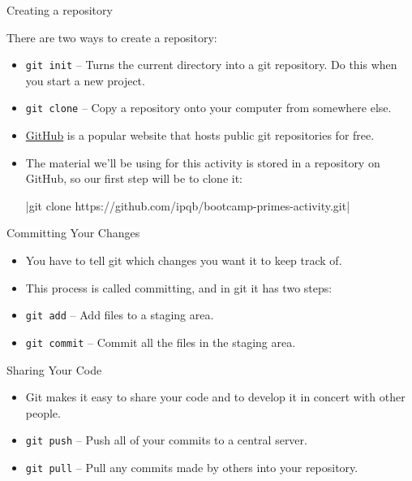 \begin{frame}{Creating a repository}

 There are two ways to create a repository:

 \begin{itemize}

  \item \texttt{git init} -- Turns the current directory into a git repository.  
   Do this when you start a new project.

  \item \texttt{git clone} -- Copy a repository onto your computer from 
   somewhere else.

  \item \href{https://github.com/}{GitHub} is a popular website that hosts 
   public git repositories for free.

  \item The material we'll be using for this activity is stored in a repository 
   on GitHub, so our first step will be to clone it:

   {\fontsize{9}{10}\selectfont
   |git clone https://github.com/ipqb/bootcamp-primes-activity.git|
   }

 \end{itemize}

\end{frame}

\begin{frame}{Committing Your Changes}

 \begin{itemize}

  \item You have to tell git which changes you want it to keep track of.

  \item This process is called committing, and in git it has two steps:

  \item \texttt{git add} -- Add files to a staging area.

  \item \texttt{git commit} -- Commit all the files in the staging area.

 \end{itemize}
 
\end{frame}

\begin{frame}{Sharing Your Code}

 \begin{itemize}

  \item Git makes it easy to share your code and to develop it in concert with 
   other people.

  \item \texttt{git push} -- Push all of your commits to a central server.

  \item \texttt{git pull} -- Pull any commits made by others into your 
   repository.

 \end{itemize}

\end{frame}
